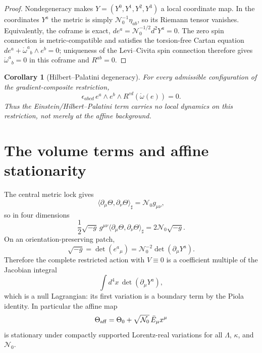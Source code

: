 \documentclass[11pt,a4paper]{article}
\newtheorem{corollary}{Corollary}
\begin{document}
\begin{proof}
Nondegeneracy makes $Y=(Y^0,Y^1,Y^2,Y^3)$ a local coordinate map.  In the
coordinates $Y^a$ the metric is simply $\mathcal N_0^{-1}\eta_{ab}$, so its
Riemann tensor vanishes.  Equivalently, the coframe is exact,
$d e^a=\mathcal N_0^{-1/2}d^2Y^a=0$.  The zero spin connection is
metric-compatible and satisfies the torsion-free Cartan equation
$d e^a+\mathring\omega^a{}_b\wedge e^b=0$; uniqueness of the Levi--Civita spin
connection therefore gives $\mathring\omega^a{}_b=0$ in this coframe and
$R^{ab}=0$.
\end{proof}

\begin{corollary}[Hilbert--Palatini degeneracy]
For every admissible configuration of the gradient-composite restriction,
\begin{equation}
 \epsilon_{abcd}\,e^a\wedge e^b\wedge
 R^{cd}(\mathring\omega(e))=0.
\end{equation}
Thus the Einstein/Hilbert--Palatini term carries no local dynamics on this
restriction, not merely at the affine background.
\end{corollary}

\section{The volume terms and affine stationarity}
The central metric lock gives
\begin{equation}
 \langle\partial_\mu\Theta,\partial_\nu\Theta\rangle_\sharp
 =\mathcal N_0 g_{\mu\nu},
\end{equation}
so in four dimensions
\begin{equation}
 \frac12\sqrt{-g}\,g^{\mu\nu}
 \langle\partial_\mu\Theta,\partial_\nu\Theta\rangle_\sharp
 =2\mathcal N_0\sqrt{-g}.
\end{equation}
On an orientation-preserving patch,
\begin{equation}
 \sqrt{-g}
 =\det(e^a{}_{\mu})
 =\mathcal N_0^{-2}\det(\partial_\mu Y^a).
\end{equation}
Therefore the complete restricted action with $V\equiv0$ is a coefficient
multiple of the Jacobian integral
\begin{equation}
 \int d^4x\,\det(\partial_\mu Y^a),
\end{equation}
which is a null Lagrangian: its first variation is a boundary term by the
Piola identity.  In particular the affine map
\begin{equation}
 \Theta_{\rm aff}=\Theta_0+
 \sqrt{\mathcal N_0}\,\bar E_\mu x^\mu
\end{equation}
is stationary under compactly supported Lorentz-real variations for all
$\Lambda$, $\kappa$, and $\mathcal N_0$.
\end{document}
